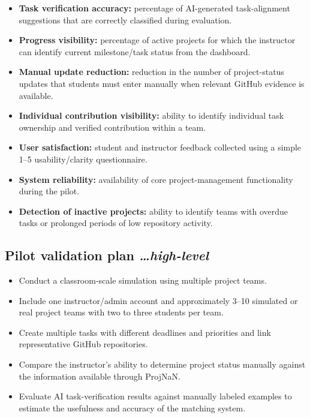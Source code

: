 \documentclass[11pt,a4paper]{article}
\newcommand{\BvrHint}[1]{%
  \texorpdfstring{%
    {\normalfont\normalsize\itshape\hfill #1}%
  }{}%
}
\begin{document}
\begin{itemize}[leftmargin=0.7cm]

    \item \textbf{Task verification accuracy:} percentage of AI-generated task-alignment suggestions that are correctly classified during evaluation.

    \item \textbf{Progress visibility:} percentage of active projects for which the instructor can identify current milestone/task status from the dashboard.

    \item \textbf{Manual update reduction:} reduction in the number of project-status updates that students must enter manually when relevant GitHub evidence is available.

    \item \textbf{Individual contribution visibility:} ability to identify individual task ownership and verified contribution within a team.

    \item \textbf{User satisfaction:} student and instructor feedback collected using a simple 1--5 usability/clarity questionnaire.

    \item \textbf{System reliability:} availability of core project-management functionality during the pilot.

    \item \textbf{Detection of inactive projects:} ability to identify teams with overdue tasks or prolonged periods of low repository activity.

\end{itemize}


\subsection{Pilot validation plan%
  \BvrHint{\ldots high-level}}

\begin{itemize}[leftmargin=0.7cm]

    \item Conduct a classroom-scale simulation using multiple project teams.

    \item Include one instructor/admin account and approximately 3--10 simulated or real project teams with two to three students per team.

    \item Create multiple tasks with different deadlines and priorities and link representative GitHub repositories.

    \item Compare the instructor's ability to determine project status manually against the information available through ProjNaN.

    \item Evaluate AI task-verification results against manually labeled examples to estimate the usefulness and accuracy of the matching system.

\end{itemize}
\end{document}
